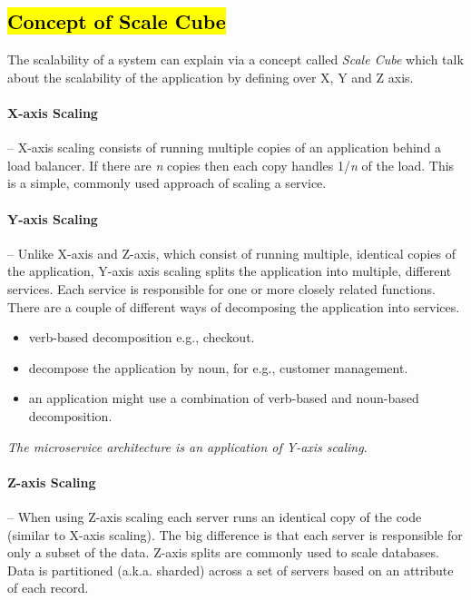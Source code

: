 \subsection{\hl{Concept of Scale Cube}}
\label{subse:scale_cube}
The scalability of a system can explain via a concept called \emph{Scale Cube} which talk about the scalability of the application by defining over X, Y and Z axis.

\paragraph{X-axis Scaling}-- X-axis scaling consists of running multiple copies of an application behind a load balancer. If there are \textit{n} copies then each copy handles 1/\textit{n} of the load. This is a simple, commonly used approach of scaling a service.

\paragraph{Y-axis Scaling}-- Unlike X-axis and Z-axis, which consist of running multiple, identical copies of the application, Y-axis axis scaling splits the application into multiple, different services. Each service is responsible for one or more closely related functions. There are a couple of different ways of decomposing the application into services.
\begin{itemize}
    \item verb-based decomposition e.g., checkout.
    \item decompose the application by noun, for e.g., customer management. 
    \item an application might use a combination of verb-based and noun-based decomposition.
\end{itemize}

\emph{The microservice architecture is an application of Y-axis scaling}.

\paragraph{Z-axis Scaling}-- When using Z-axis scaling each server runs an identical copy of the code (similar to X-axis scaling). The big difference is that each server is responsible for only a subset of the data. 
Z-axis splits are commonly used to scale databases. Data is partitioned (a.k.a. sharded) across a set of servers based on an attribute of each record.

